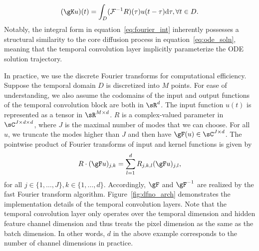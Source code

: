 \begin{equation}
   (\gK u)(t) = \int_{D} (\mathcal{F}^{-1}R)(\tau)u(t-\tau) \df \tau, \forall t\in D. \label{eq:fourier_int}
\end{equation}
Notably, the integral form in equation~\ref{eq:fourier_int} inherently possesses a structural similarity to the core diffusion process in equation~\ref{eq:ode_soln}, meaning that the temporal convolution layer implicitly parameterize the ODE solution trajectory. 

In practice, we use the discrete Fourier transforms for computational efficiency.
Suppose the temporal domain $D$ is discretized into $M$ points. 
For ease of understanding, we also assume the codomains of the input and output functions of the temporal convolution block are both in $\sR^d$. 
 The input function $u(t)$ is represented as a tensor in $\sR^{M\times d}$. $R$ is a complex-valued parameter in $\sC^{J\times d \times d}$, where $J$ is the maximal number of modes that we can choose. For all $u$, we truncate the modes higher than $J$ and then have $\gF(u) \in \sC^{J\times d}$. The pointwise product of Fourier transforms of input and kernel functions is given by
\begin{align}
    R \cdot (\gF u)_{j,k} = \sum_{l=1}^{d} R_{j,k,l} (\gF u)_{j,l}, 
\end{align}
for all $ j\in \{1,\dots, J\}, k\in \{1,\dots, d\}$. Accordingly, $\gF$ and $\gF^{-1}$ are realized by the fast Fourier transform algorithm. 
Figure~\ref{fig:dfno_arch} demonstrates the implementation details of the temporal convolution layers. Note that the temporal convolution layer only operates over the temporal dimension and hidden feature channel dimension and thus treats the pixel dimension as the same as the batch dimension. In other words, $d$ in the above example corresponds to the number of channel dimensions in practice. 



















